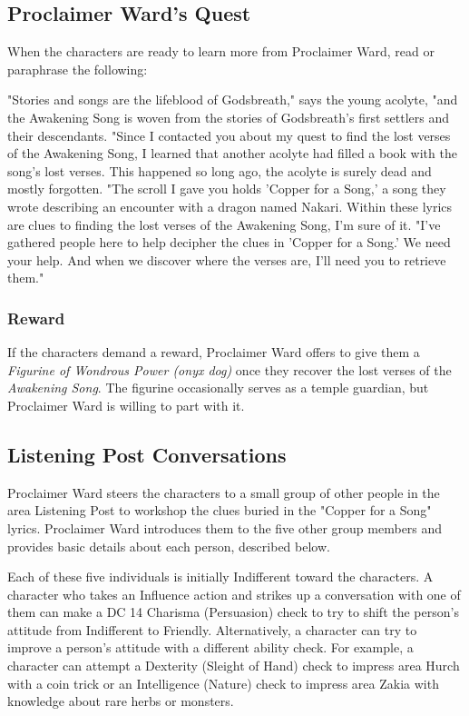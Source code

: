 \documentclass[letterpaper, 11pt, twocolumn]{dndbook}
\begin{document}

\subsection{Proclaimer Ward's Quest}

When the characters are ready to learn more from Proclaimer Ward, read or paraphrase the following:

\begin{DndReadAloud}
"Stories and songs are the lifeblood of Godsbreath," says the young acolyte, "and the Awakening Song is woven from the stories of Godsbreath's first settlers and their descendants. "Since I contacted you about my quest to find the lost verses of the Awakening Song, I learned that another acolyte had filled a book with the song's lost verses. This happened so long ago, the acolyte is surely dead and mostly forgotten. "The scroll I gave you holds 'Copper for a Song,' a song they wrote describing an encounter with a dragon named Nakari. Within these lyrics are clues to finding the lost verses of the Awakening Song, I'm sure of it. "I've gathered people here to help decipher the clues in 'Copper for a Song.' We need your help. And when we discover where the verses are, I'll need you to retrieve them."
\end{DndReadAloud}

\subsubsection{Reward}

If the characters demand a reward, Proclaimer Ward offers to give them a \textit{Figurine of Wondrous Power (onyx dog)} once they recover the lost verses of the \textit{Awakening Song}. The figurine occasionally serves as a temple guardian, but Proclaimer Ward is willing to part with it.

\subsection{Listening Post Conversations}

Proclaimer Ward steers the characters to a small group of other people in the area Listening Post to workshop the clues buried in the "Copper for a Song" lyrics. Proclaimer Ward introduces them to the five other group members and provides basic details about each person, described below.

Each of these five individuals is initially Indifferent toward the characters. A character who takes an Influence action and strikes up a conversation with one of them can make a DC 14 Charisma (Persuasion) check to try to shift the person's attitude from Indifferent to Friendly. Alternatively, a character can try to improve a person's attitude with a different ability check. For example, a character can attempt a Dexterity (Sleight of Hand) check to impress area Hurch with a coin trick or an Intelligence (Nature) check to impress area Zakia with knowledge about rare herbs or monsters.
\end{document}
